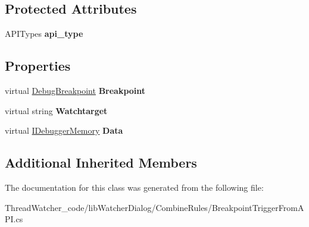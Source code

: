 \subsection*{Protected Attributes}
\begin{DoxyCompactItemize}
\item 
\hypertarget{classlib_watcher_dialog_1_1_combine_rules_1_1_breakpoint_trigger_from_a_p_i_a1fd77962dd6344b5f31de1bfd541ad64}{A\+P\+I\+Types {\bfseries api\+\_\+type}}\label{classlib_watcher_dialog_1_1_combine_rules_1_1_breakpoint_trigger_from_a_p_i_a1fd77962dd6344b5f31de1bfd541ad64}

\end{DoxyCompactItemize}
\subsection*{Properties}
\begin{DoxyCompactItemize}
\item 
\hypertarget{classlib_watcher_dialog_1_1_combine_rules_1_1_breakpoint_trigger_from_a_p_i_a963367bea3c7de8c395c52b4c08f47ad}{virtual \hyperlink{classlib_wather_debugger_1_1_breakpoint_1_1_debug_breakpoint}{Debug\+Breakpoint} {\bfseries Breakpoint}}\label{classlib_watcher_dialog_1_1_combine_rules_1_1_breakpoint_trigger_from_a_p_i_a963367bea3c7de8c395c52b4c08f47ad}

\item 
\hypertarget{classlib_watcher_dialog_1_1_combine_rules_1_1_breakpoint_trigger_from_a_p_i_a5ce9cb65fd0dfb5bcbf04c0d515fe990}{virtual string {\bfseries Watchtarget}}\label{classlib_watcher_dialog_1_1_combine_rules_1_1_breakpoint_trigger_from_a_p_i_a5ce9cb65fd0dfb5bcbf04c0d515fe990}

\item 
\hypertarget{classlib_watcher_dialog_1_1_combine_rules_1_1_breakpoint_trigger_from_a_p_i_a92cee1b22762e387b92154235fcfc8fe}{virtual \hyperlink{interfacelib_utilities_1_1_i_debugger_memory}{I\+Debugger\+Memory} {\bfseries Data}}\label{classlib_watcher_dialog_1_1_combine_rules_1_1_breakpoint_trigger_from_a_p_i_a92cee1b22762e387b92154235fcfc8fe}

\end{DoxyCompactItemize}
\subsection*{Additional Inherited Members}


The documentation for this class was generated from the following file\+:\begin{DoxyCompactItemize}
\item 
Thread\+Watcher\+\_\+code/lib\+Watcher\+Dialog/\+Combine\+Rules/Breakpoint\+Trigger\+From\+A\+P\+I.\+cs\end{DoxyCompactItemize}
